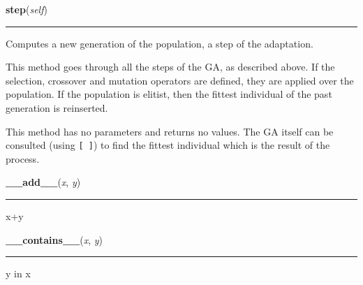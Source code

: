     \begin{boxedminipage}{\textwidth}

    \raggedright \textbf{step}(\textit{self})

    \vspace{-1.5ex}

    \rule{\textwidth}{0.5\fboxrule}

Computes a new generation of the population, a step of the adaptation.

This method goes through all the steps of the GA, as described above. If
the selection, crossover and mutation operators are defined, they are
applied over the population. If the population is elitist, then the
fittest individual of the past generation is reinserted.

This method has no parameters and returns no values. The GA itself can
be consulted (using \texttt{{[} {]}}) to find the fittest individual which is the
result of the process.
    \vspace{1ex}

    \end{boxedminipage}

    \label{list:__add__}

    \vspace{0.5ex}

    \begin{boxedminipage}{\textwidth}

    \raggedright \textbf{\_\_add\_\_}(\textit{x}, \textit{y})

    \vspace{-1.5ex}

    \rule{\textwidth}{0.5\fboxrule}

x+y
    \vspace{1ex}

    \end{boxedminipage}

    \label{list:__contains__}

    \vspace{0.5ex}

    \begin{boxedminipage}{\textwidth}

    \raggedright \textbf{\_\_contains\_\_}(\textit{x}, \textit{y})

    \vspace{-1.5ex}

    \rule{\textwidth}{0.5\fboxrule}

y in x
    \vspace{1ex}

    \end{boxedminipage}


